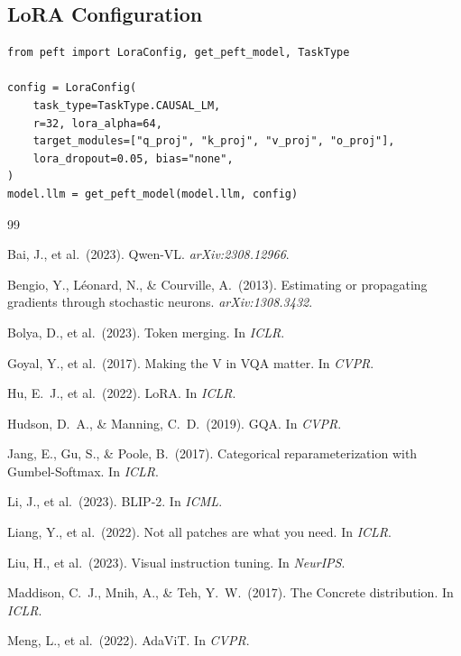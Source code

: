 \documentclass[11pt,a4paper]{article}
\begin{document}
\subsection{LoRA Configuration}

\begin{lstlisting}[caption={LoRA setup via PEFT.}, numbers=none]
from peft import LoraConfig, get_peft_model, TaskType

config = LoraConfig(
    task_type=TaskType.CAUSAL_LM,
    r=32, lora_alpha=64,
    target_modules=["q_proj", "k_proj", "v_proj", "o_proj"],
    lora_dropout=0.05, bias="none",
)
model.llm = get_peft_model(model.llm, config)
\end{lstlisting}

\begin{thebibliography}{99}

Bai, J., et al.\ (2023). Qwen-VL. \emph{arXiv:2308.12966}.

Bengio, Y., L\'{e}onard, N., \& Courville, A.\ (2013).
Estimating or propagating gradients through stochastic neurons.
\emph{arXiv:1308.3432}.

Bolya, D., et al.\ (2023). Token merging. In \emph{ICLR}.

Goyal, Y., et al.\ (2017). Making the V in VQA matter. In \emph{CVPR}.

Hu, E.~J., et al.\ (2022). LoRA. In \emph{ICLR}.

Hudson, D.~A., \& Manning, C.~D.\ (2019). GQA. In \emph{CVPR}.

Jang, E., Gu, S., \& Poole, B.\ (2017).
Categorical reparameterization with Gumbel-Softmax. In \emph{ICLR}.

Li, J., et al.\ (2023). BLIP-2. In \emph{ICML}.

Liang, Y., et al.\ (2022). Not all patches are what you need. In \emph{ICLR}.

Liu, H., et al.\ (2023). Visual instruction tuning. In \emph{NeurIPS}.

Maddison, C.~J., Mnih, A., \& Teh, Y.~W.\ (2017).
The Concrete distribution. In \emph{ICLR}.

Meng, L., et al.\ (2022). AdaViT. In \emph{CVPR}.


\end{thebibliography}
\end{document}
